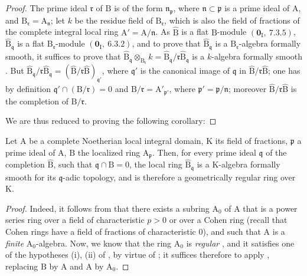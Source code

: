 \begin{proof}
The prime ideal $\mathfrak{r}$ of $\mathrm{B}$ is of the form $\mathfrak{n}_\mathfrak{p}$, where $\mathfrak{n}\subset\mathfrak{p}$ is a prime ideal of $\mathrm{A}$, and $\mathrm{B}_\mathfrak{r}=\mathrm{A}_\mathfrak{n}$; let $k$ be the residue field of $\mathrm{B}_\mathfrak{r}$, which is also the field of fractions of the complete integral local ring $\mathrm{A}'=\mathrm{A}/\mathfrak{n}$.
As $\widehat{\mathrm{B}}$ is a flat $\mathrm{B}$-module $(\mathbf{0}_\mathrm{I},~7.3.5)$, $\widehat{\mathrm{B}}_\mathfrak{q}$ is a flat $\mathrm{B}_\mathfrak{r}$-module $(\mathbf{0}_\mathrm{I},~6.3.2)$, and to prove that $\widehat{\mathrm{B}}_\mathfrak{q}$ is a $\mathrm{B}_\mathfrak{r}$-algebra formally smooth, it suffices to prove that $\widehat{\mathrm{B}}_\mathfrak{q}\otimes_{\mathrm{B}_\mathfrak{r}}k
=\widehat{\mathrm{B}}_\mathfrak{q}/\mathfrak{r}\widehat{\mathrm{B}}_\mathfrak{q}$
is a $k$-algebra formally smooth .
But $\widehat{\mathrm{B}}_\mathfrak{q}/\mathfrak{r}\widehat{\mathrm{B}}_\mathfrak{q}=(\widehat{\mathrm{B}}/\mathfrak{r}\widehat{\mathrm{B}})_{\mathfrak{q}'}$, where $\mathfrak{q}'$ is the canonical image of $\mathfrak{q}$ in $\widehat{\mathrm{B}}/\mathfrak{r}\widehat{\mathrm{B}}$; one has by definition $\mathfrak{q}'\cap(\mathrm{B}/\mathfrak{r})=0$ and $\mathrm{B}/\mathfrak{r}=\mathrm{A}'_{\mathfrak{p}'}$, where $\mathfrak{p}'=\mathfrak{p}/\mathfrak{n}$; moreover $\widehat{\mathrm{B}}/\mathfrak{r}\widehat{\mathrm{B}}$ is the completion of $\mathrm{B}/\mathfrak{r}$.

We are thus reduced to proving the following corollary:
\end{proof}

\begin{corollary}[22.3.4]
\label{0.22.3.4}
Let $\mathrm{A}$ be a \textup{complete} Noetherian local integral domain, $\mathrm{K}$ its field of fractions, $\mathfrak{p}$ a prime ideal of $\mathrm{A}$, $\mathrm{B}$ the localized ring $\mathrm{A}_\mathfrak{p}$.
Then, for every prime ideal $\mathfrak{q}$
of the completion $\widehat{\mathrm{B}}$, such that $\mathfrak{q}\cap\mathrm{B}=0$, the local ring $\widehat{\mathrm{B}}_\mathfrak{q}$ is a $\mathrm{K}$-algebra formally smooth for its $\mathfrak{q}$-adic topology, and is therefore a geometrically regular ring over $\mathrm{K}$.
\end{corollary}

\begin{proof}
Indeed, it follows from  that there exists a subring $\mathrm{A}_0$ of $\mathrm{A}$ that is a power series ring over a field of characteristic $p>0$ or over a Cohen ring (recall that Cohen rings have a field of fractions of characteristic $0$), and such that $\mathrm{A}$ is a \emph{finite} $\mathrm{A}_0$-algebra.
Now, we know that the ring $\mathrm{A}_0$ is \emph{regular} , and it satisfies one of the hypotheses (i), (ii) of , by virtue of ; it suffices therefore to apply , replacing $\mathrm{B}$ by $\mathrm{A}$ and $\mathrm{A}$ by $\mathrm{A}_0$.
\end{proof}

